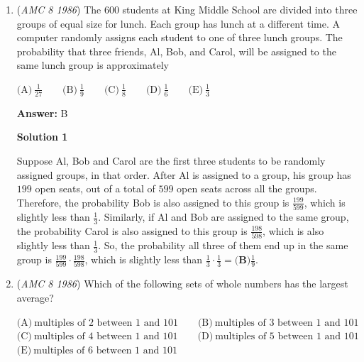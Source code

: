 \begin{enumerate}
 



\textbf{Solution 2}

Let $A$ be the area of one of the small circles.  Since all circles are similar, the large circle's area is $2^2 \cdot A = 4A$.  So, the area inside the large circle but outside the small circles is $4A - 2A = 2A$.  Therefore, the shaded region must then be $\frac{2A}{2} = A$, so the desired ratio is $\frac{A}{A} = \boxed{\textbf{(B)}\ 1}$.

 


	\item (\textit{AMC 8 1986}) The $600$ students at King Middle School are divided into three groups of equal size for lunch.  Each group has lunch at a different time.  A computer randomly assigns each student to one of three lunch groups.  The probability that three friends, Al, Bob, and Carol, will be assigned to the same lunch group is approximately


 $\text{(A)}\ \frac{1}{27} \qquad \text{(B)}\ \frac{1}{9} \qquad \text{(C)}\ \frac{1}{8} \qquad \text{(D)}\ \frac{1}{6} \qquad \text{(E)}\ \frac{1}{3}$

 \textbf{Answer: }B



\textbf{Solution 1}

Suppose Al, Bob and Carol are the first three students to be randomly assigned groups, in that order.  After Al is assigned to a group, his group has $199$ open seats, out of a total of $599$ open seats across all the groups.  Therefore, the probability Bob is also assigned to this group is $\frac{199}{599}$, which is slightly less than $\frac{1}{3}$.  Similarly, if Al and Bob are assigned to the same group, the probability Carol is also assigned to this group is $\frac{198}{598}$, which is also slightly less than $\frac{1}{3}$.  So, the probability all three of them end up in the same group is $\frac{199}{599} \cdot \frac{198}{598}$, which is slightly less than $\frac{1}{3} \cdot \frac{1}{3} = \boxed{\textbf{(B)} \frac{1}{9}}$.

 


	\item (\textit{AMC 8 1986}) Which of the following sets of whole numbers has the largest average?


 $\text{(A)}\ \text{multiples of 2 between 1 and 101} \qquad \text{(B)}\ \text{multiples of 3 between 1 and 101}$
$\text{(C)}\ \text{multiples of 4 between 1 and 101} \qquad \text{(D)}\ \text{multiples of 5 between 1 and 101}$
$\text{(E)}\ \text{multiples of 6 between 1 and 101}$


\end{enumerate}
